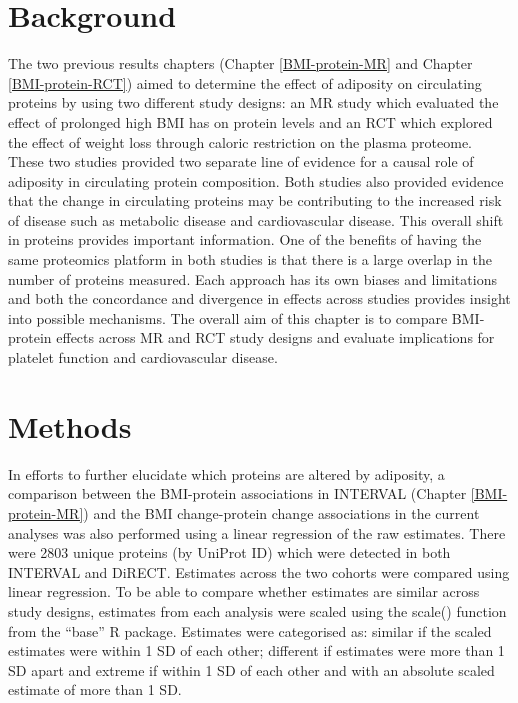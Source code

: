 \documentclass[11pt,twoside]{bristolthesis}
\begin{document}
\hypertarget{background-5}{%
\section{Background}\label{background-5}}

The two previous results chapters (Chapter \ref{BMI-protein-MR} and Chapter \ref{BMI-protein-RCT}) aimed to determine the effect of adiposity on circulating proteins by using two different study designs: an MR study which evaluated the effect of prolonged high BMI has on protein levels and an RCT which explored the effect of weight loss through caloric restriction on the plasma proteome. These two studies provided two separate line of evidence for a causal role of adiposity in circulating protein composition. Both studies also provided evidence that the change in circulating proteins may be contributing to the increased risk of disease such as metabolic disease and cardiovascular disease. This overall shift in proteins provides important information. One of the benefits of having the same proteomics platform in both studies is that there is a large overlap in the number of proteins measured. Each approach has its own biases and limitations and both the concordance and divergence in effects across studies provides insight into possible mechanisms. The overall aim of this chapter is to compare BMI-protein effects across MR and RCT study designs and evaluate implications for platelet function and cardiovascular disease.

\hypertarget{methods-4}{%
\section{Methods}\label{methods-4}}

In efforts to further elucidate which proteins are altered by adiposity, a comparison between the BMI-protein associations in INTERVAL (Chapter \ref{BMI-protein-MR}) and the BMI change-protein change associations in the current analyses was also performed using a linear regression of the raw estimates. There were 2803 unique proteins (by UniProt ID) which were detected in both INTERVAL and DiRECT. Estimates across the two cohorts were compared using linear regression. To be able to compare whether estimates are similar across study designs, estimates from each analysis were scaled using the scale() function from the ``base'' R package. Estimates were categorised as: similar if the scaled estimates were within 1 SD of each other; different if estimates were more than 1 SD apart and extreme if within 1 SD of each other and with an absolute scaled estimate of more than 1 SD.
\end{document}
